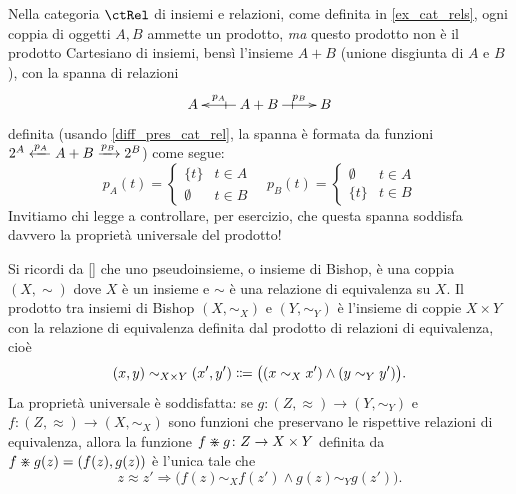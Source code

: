 \begin{example}\label{ex_prodotti_in_rel}
 Nella categoria \(\ctRel\) di insiemi e relazioni, come definita  in \ref{ex_cat_rels}, ogni coppia di oggetti \(A,B\) ammette un prodotto, \emph{ma}	questo prodotto non è il prodotto Cartesiano di insiemi, bensì l'insieme \(A + B\) (unione disgiunta di \(A\) e \(B\)), con la spanna di relazioni
 \[\xymatrix{
  A & A+B \ar[r]|@-{|}^-{p_B}\ar[l]|@-{|}_-{p_A}& B
  }\]
 definita (usando \ref{diff_pres_cat_rel}, la spanna è formata da funzioni \(2^{A} \xleftarrow{p_A} A+B \xrightarrow{p_B} 2^{B}\)) come segue:
 \[p_A(t)=\begin{cases}
   \{t\}     & t\in A \\
   \emptyset & t\in B
  \end{cases}\quad
  p_B(t)=\begin{cases}
   \emptyset & t\in A \\
   \{t\}     & t\in B
  \end{cases}\]
 Invitiamo chi legge a controllare, per esercizio, che questa spanna soddisfa davvero la proprietà universale del prodotto!
\end{example}
\begin{example}\label{ex_prodotti_in_bishop}
 Si ricordi da \ref{} che uno pseudoinsieme, o insieme di Bishop, è una coppia \((X,\sim)\) dove \(X\) è un insieme	e \(\sim\) è una relazione di equivalenza su \(X\). Il prodotto tra insiemi di Bishop	\((X,\sim_X)\) e \((Y,\sim_Y)\) è l'insieme di coppie \(X\times Y\) con la relazione di equivalenza definita dal prodotto	di relazioni di equivalenza, cioè
 \[(x,y)\sim_{X\times Y} (x',y') \defeq \bigl((x\sim_X x') \land (y\sim_Y y')\bigr).\]
 La proprietà universale è soddisfatta: se \(g \colon (Z,\approx)\to (Y,\sim_Y)\) e \(f \colon (Z,\approx)\to (X,\sim_X)\) sono funzioni che preservano le rispettive relazioni di equivalenza, allora la funzione \(f\divideontimes g \colon Z\to X\times Y\) definita da \(f\divideontimes g(z) = (f(z),g(z))\) è l'unica tale che
 \[z\approx z' \Rightarrow \bigl(f(z)\sim_X f(z') \land g(z)\sim_Y g(z')\bigr).\]
\end{example}
